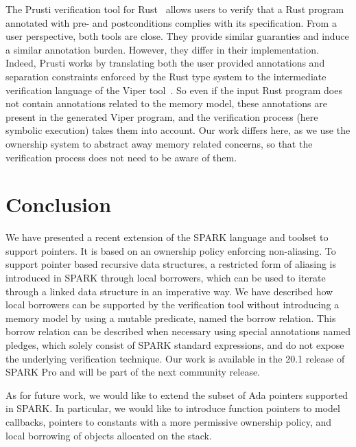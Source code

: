 \documentclass[runningheads]{llncs}
\begin{document}
The Prusti verification tool for Rust~\cite{astrauskas2019leveraging} allows users to verify that a Rust program annotated with pre- and postconditions complies with its specification. From a user perspective, both tools are close. They provide similar guaranties and induce a similar annotation burden. However, they differ in their implementation. Indeed, Prusti works by translating both the user provided annotations and separation constraints enforced by the Rust type system to the intermediate verification language of the Viper tool~\cite{muller2016viper}. %
So even if the input Rust program does not contain annotations related to the memory model, these annotations are present in the generated Viper program, and the verification process (here symbolic execution) takes them into account. Our work differs here, as we use the ownership system to abstract away memory related concerns, so that the verification process does not need to be aware of them.

\section{Conclusion}
We have presented a recent extension of the SPARK language and toolset to support pointers. It is based on an ownership policy enforcing non-aliasing. To support pointer based recursive data structures, a restricted form of aliasing is introduced in SPARK through local borrowers, which can be used to iterate through a linked data structure in an imperative way. We have described how local borrowers can be supported by the verification tool without introducing a memory model by using a mutable predicate, named the borrow relation. This borrow relation can be described when necessary using special annotations named pledges, which solely consist of SPARK standard expressions, and do not expose the underlying verification technique. Our work is available in the 20.1 release of SPARK Pro and will be part of the next community release.

As for future work, we would like to extend the subset of Ada pointers supported in SPARK. In particular, we would like to introduce function pointers to model callbacks, pointers to constants with a more permissive ownership policy, and local borrowing of objects allocated on the stack.
\end{document}
